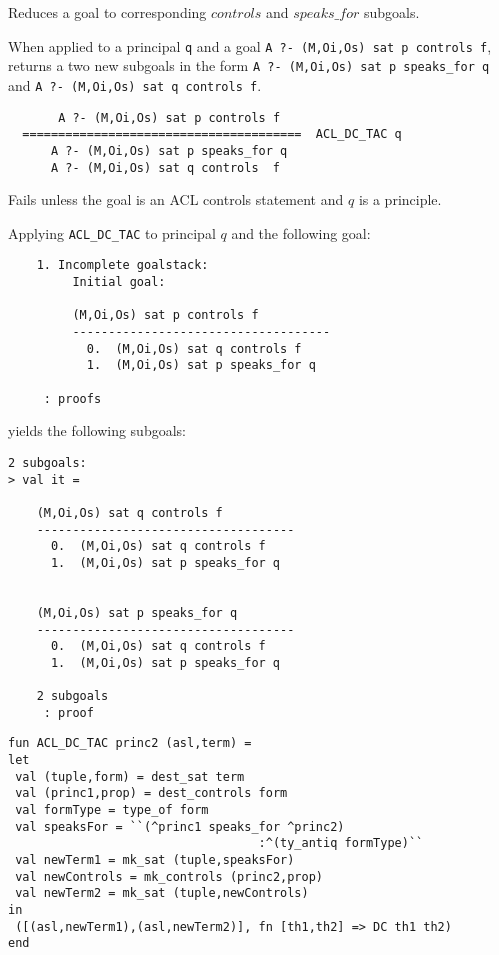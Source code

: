 \SYNOPSIS
Reduces a goal to corresponding $controls$ and $speaks\_for$ subgoals.

\DESCRIBE When applied to a principal \texttt{q} and a goal \texttt{A ?- (M,Oi,Os) sat p controls f}, returns a two new subgoals in the form \texttt{A ?- (M,Oi,Os) sat p speaks_for q} and \texttt{A ?- (M,Oi,Os) sat q controls f}.
\begin{verbatim}
       A ?- (M,Oi,Os) sat p controls f
  =======================================  ACL_DC_TAC q
      A ?- (M,Oi,Os) sat p speaks_for q     
      A ?- (M,Oi,Os) sat q controls  f
\end{verbatim}

\FAILURE 
Fails unless the goal is an ACL controls statement and $q$ is a principle.

\EXAMPLE
Applying \texttt{ACL\_DC\_TAC} to principal $q$ and the following goal:
\begin{holboxed}
\begin{verbatim}
    1. Incomplete goalstack:
         Initial goal:
    
         (M,Oi,Os) sat p controls f
         ------------------------------------
           0.  (M,Oi,Os) sat q controls f
           1.  (M,Oi,Os) sat p speaks_for q
    
     : proofs
\end{verbatim}
\end{holboxed}
yields the following subgoals:
\begin{holboxed}
\begin{verbatim}
2 subgoals:
> val it =
    
    (M,Oi,Os) sat q controls f
    ------------------------------------
      0.  (M,Oi,Os) sat q controls f
      1.  (M,Oi,Os) sat p speaks_for q
    
    
    (M,Oi,Os) sat p speaks_for q
    ------------------------------------
      0.  (M,Oi,Os) sat q controls f
      1.  (M,Oi,Os) sat p speaks_for q
    
    2 subgoals
     : proof
\end{verbatim}
\end{holboxed}

\IMPLEMENTATION
\begin{holboxed}
\begin{verbatim}
fun ACL_DC_TAC princ2 (asl,term) =
let
 val (tuple,form) = dest_sat term
 val (princ1,prop) = dest_controls form
 val formType = type_of form
 val speaksFor = ``(^princ1 speaks_for ^princ2)
                                   :^(ty_antiq formType)``
 val newTerm1 = mk_sat (tuple,speaksFor)
 val newControls = mk_controls (princ2,prop)
 val newTerm2 = mk_sat (tuple,newControls)
in
 ([(asl,newTerm1),(asl,newTerm2)], fn [th1,th2] => DC th1 th2)
end
\end{verbatim}
\end{holboxed}

